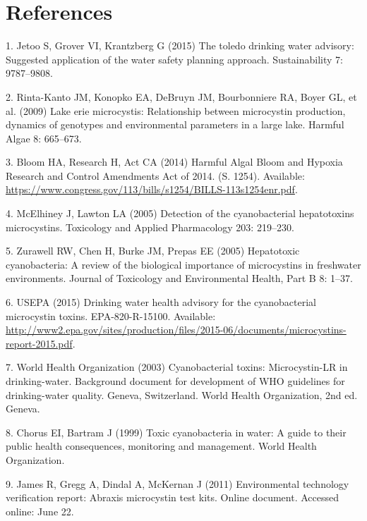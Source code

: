 \documentclass[11pt,]{article}
\begin{document}
\newpage

\section*{References}\label{references}

\hypertarget{refs}{}
\hypertarget{ref-jetoo2015toledo}{}
1. Jetoo S, Grover VI, Krantzberg G (2015) The toledo drinking water
advisory: Suggested application of the water safety planning approach.
Sustainability 7: 9787--9808.

\hypertarget{ref-rinta2009lake}{}
2. Rinta-Kanto JM, Konopko EA, DeBruyn JM, Bourbonniere RA, Boyer GL, et
al. (2009) Lake erie microcystis: Relationship between microcystin
production, dynamics of genotypes and environmental parameters in a
large lake. Harmful Algae 8: 665--673.

\hypertarget{ref-HABHRCA2014}{}
3. Bloom HA, Research H, Act CA (2014) Harmful Algal Bloom and Hypoxia
Research and Control Amendments Act of 2014. (S. 1254). Available:
\url{https://www.congress.gov/113/bills/s1254/BILLS-113s1254enr.pdf}.

\hypertarget{ref-mcelhiney2005detection}{}
4. McElhiney J, Lawton LA (2005) Detection of the cyanobacterial
hepatotoxins microcystins. Toxicology and Applied Pharmacology 203:
219--230.

\hypertarget{ref-zurawell2005hepatotoxic}{}
5. Zurawell RW, Chen H, Burke JM, Prepas EE (2005) Hepatotoxic
cyanobacteria: A review of the biological importance of microcystins in
freshwater environments. Journal of Toxicology and Environmental Health,
Part B 8: 1--37.

\hypertarget{ref-usepa2015drinking}{}
6. USEPA (2015) Drinking water health advisory for the cyanobacterial
microcystin toxins. EPA-820-R-15100. Available:
\url{http://www2.epa.gov/sites/production/files/2015-06/documents/microcystins-report-2015.pdf}.

\hypertarget{ref-world2003cyanobacterial}{}
7. World Health Organization (2003) Cyanobacterial toxins:
Microcystin-LR in drinking-water. Background document for development of
WHO guidelines for drinking-water quality. Geneva, Switzerland. World
Health Organization, 2nd ed. Geneva.

\hypertarget{ref-chorus1999toxic}{}
8. Chorus EI, Bartram J (1999) Toxic cyanobacteria in water: A guide to
their public health consequences, monitoring and management. World
Health Organization.

\hypertarget{ref-james2011environmental}{}
9. James R, Gregg A, Dindal A, McKernan J (2011) Environmental
technology verification report: Abraxis microcystin test kits. Online
document. Accessed online: June 22.
\end{document}
